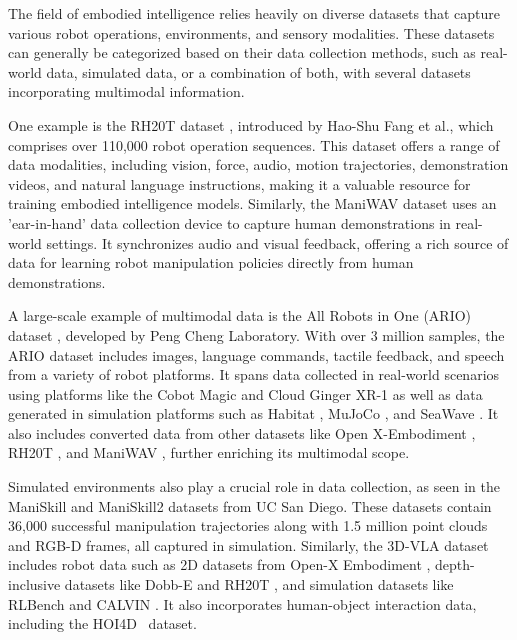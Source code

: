 The field of embodied intelligence relies heavily on diverse datasets that capture various robot operations, environments, and sensory modalities. These datasets can generally be categorized based on their data collection methods, such as real-world data, simulated data, or a combination of both, with several datasets incorporating multimodal information.

One example is the RH20T dataset  \cite{fang2024rh20t}, introduced by Hao-Shu Fang et al., which comprises over 110,000 robot operation sequences. This dataset offers a range of data modalities, including vision, force, audio, motion trajectories, demonstration videos, and natural language instructions, making it a valuable resource for training embodied intelligence models. Similarly, the ManiWAV dataset  \cite{liu2024maniwav} uses an 'ear-in-hand' data collection device to capture human demonstrations in real-world settings. It synchronizes audio and visual feedback, offering a rich source of data for learning robot manipulation policies directly from human demonstrations.

A large-scale example of multimodal data is the All Robots in One (ARIO) dataset  \cite{wang2024all}, developed by Peng Cheng Laboratory. With over 3 million samples, the ARIO dataset includes images, language commands, tactile feedback, and speech from a variety of robot platforms. It spans data collected in real-world scenarios using platforms like the Cobot Magic and Cloud Ginger XR-1 as well as data generated in simulation platforms such as Habitat \cite{savva2019habitat}, MuJoCo \cite{todorov2012mujoco}, and SeaWave \cite{ren2024surferprogressivereasoningworld}. It also includes converted data from other datasets like Open X-Embodiment \cite{o2024open}, RH20T \cite{fang2024rh20t}, and ManiWAV \cite{liu2024maniwav}, further enriching its multimodal scope.

Simulated environments also play a crucial role in data collection, as seen in the ManiSkill  \cite{mu2021maniskill} and ManiSkill2  \cite{gu2023maniskill2} datasets from UC San Diego. These datasets contain 36,000 successful manipulation trajectories along with 1.5 million point clouds and RGB-D frames, all captured in simulation. Similarly, the 3D-VLA  \cite{zhen20243d} dataset includes robot data such as 2D datasets from Open-X Embodiment \cite{o2024open}, depth-inclusive datasets like Dobb-E \cite{shafiullah2023dobbe} and RH20T \cite{fang2024rh20t}, and simulation datasets like RLBench \cite{james2020rlbench} and CALVIN \cite{mees2022calvin}. It also incorporates human-object interaction data, including the HOI4D~\cite{Liu_2022_CVPR} dataset.

